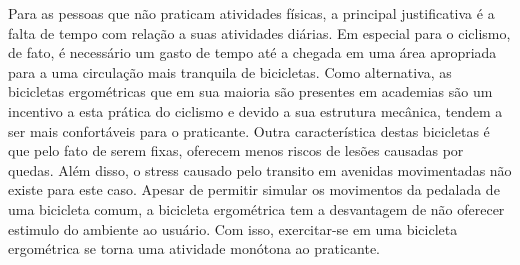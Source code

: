 Para as pessoas que não praticam atividades físicas, a principal justificativa é a falta de tempo com relação a suas atividades diárias. Em especial para o ciclismo, de fato, é necessário um gasto de tempo até a chegada em uma área apropriada para a uma circulação mais tranquila de bicicletas. Como alternativa, as bicicletas ergométricas que em sua maioria são presentes em academias são um incentivo a esta prática do ciclismo e devido a sua estrutura mecânica, tendem a ser mais confortáveis para o praticante.
Outra característica destas bicicletas é que pelo fato de serem fixas, oferecem menos riscos de lesões causadas por quedas. Além disso, o stress causado pelo transito em avenidas movimentadas não existe para este caso. Apesar de permitir simular os movimentos da pedalada de uma bicicleta comum, a bicicleta ergométrica tem a desvantagem de não oferecer estimulo do ambiente ao usuário. Com isso, exercitar-se em uma bicicleta ergométrica se torna uma atividade monótona ao praticante.


